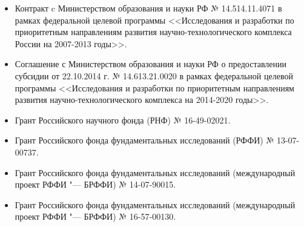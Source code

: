 \begin{itemize}
    \item Контракт c Министерством образования и науки РФ № 14.514.11.4071 в рамках федеральной целевой программы <<Исследования и разработки по приоритетным направлениям развития научно-технологического комплекса России на 2007-2013 годы>>.
	\item Соглашение с Министерством образования и науки РФ о предоставлении субсидии от 22.10.2014 г. № 14.613.21.0020 в рамках федеральной целевой программы <<Исследования и разработки по приоритетным направлениям развития научно-технологического комплекса на 2014-2020 годы>>.
	\item Грант Российского научного фонда (РНФ) № 16-49-02021.
	\item Грант Российского фонда фундаментальных исследований (РФФИ) № 13-07-00737.
	\item Грант Российского фонда фундаментальных исследований (международный проект РФФИ "--- БРФФИ) № 14-07-90015.
	\item Грант Российского фонда фундаментальных исследований (международный проект РФФИ "--- БРФФИ) № 16-57-00130.


\end{itemize}
